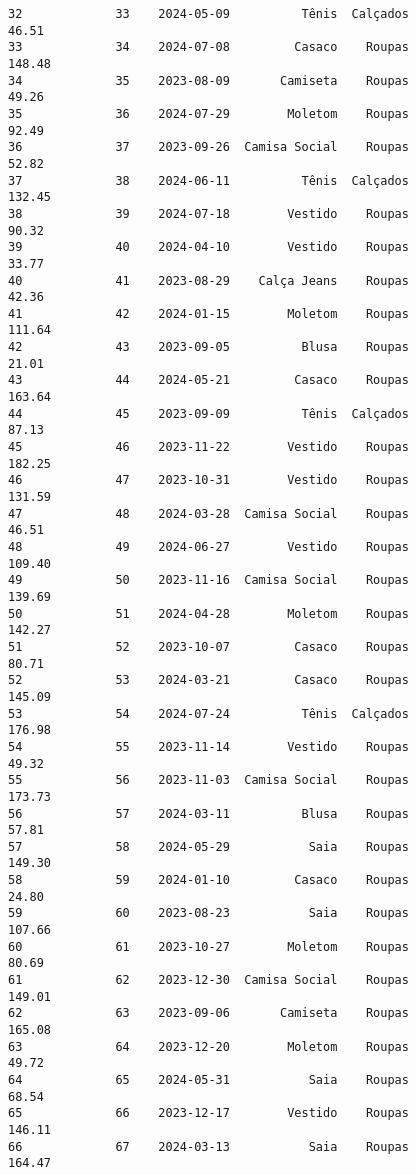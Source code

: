 \documentclass[11pt]{article}
\begin{document}
\begin{Verbatim}[commandchars=\\\{\}]
32             33    2024-05-09          Tênis  Calçados           46.51   
33             34    2024-07-08         Casaco    Roupas          148.48   
34             35    2023-08-09       Camiseta    Roupas           49.26   
35             36    2024-07-29        Moletom    Roupas           92.49   
36             37    2023-09-26  Camisa Social    Roupas           52.82   
37             38    2024-06-11          Tênis  Calçados          132.45   
38             39    2024-07-18        Vestido    Roupas           90.32   
39             40    2024-04-10        Vestido    Roupas           33.77   
40             41    2023-08-29    Calça Jeans    Roupas           42.36   
41             42    2024-01-15        Moletom    Roupas          111.64   
42             43    2023-09-05          Blusa    Roupas           21.01   
43             44    2024-05-21         Casaco    Roupas          163.64   
44             45    2023-09-09          Tênis  Calçados           87.13   
45             46    2023-11-22        Vestido    Roupas          182.25   
46             47    2023-10-31        Vestido    Roupas          131.59   
47             48    2024-03-28  Camisa Social    Roupas           46.51   
48             49    2024-06-27        Vestido    Roupas          109.40   
49             50    2023-11-16  Camisa Social    Roupas          139.69   
50             51    2024-04-28        Moletom    Roupas          142.27   
51             52    2023-10-07         Casaco    Roupas           80.71   
52             53    2024-03-21         Casaco    Roupas          145.09   
53             54    2024-07-24          Tênis  Calçados          176.98   
54             55    2023-11-14        Vestido    Roupas           49.32   
55             56    2023-11-03  Camisa Social    Roupas          173.73   
56             57    2024-03-11          Blusa    Roupas           57.81   
57             58    2024-05-29           Saia    Roupas          149.30   
58             59    2024-01-10         Casaco    Roupas           24.80   
59             60    2023-08-23           Saia    Roupas          107.66   
60             61    2023-10-27        Moletom    Roupas           80.69   
61             62    2023-12-30  Camisa Social    Roupas          149.01   
62             63    2023-09-06       Camiseta    Roupas          165.08   
63             64    2023-12-20        Moletom    Roupas           49.72   
64             65    2024-05-31           Saia    Roupas           68.54   
65             66    2023-12-17        Vestido    Roupas          146.11   
66             67    2024-03-13           Saia    Roupas          164.47   

\end{Verbatim}
\end{document}

